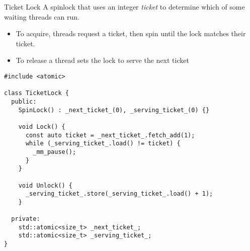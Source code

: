 \begin{definitionbox}{Ticket Lock}
	A spinlock that uses an integer \textit{ticket} to determine which of some waiting threads can run.
	\begin{itemize}
		\item To acquire, threads request a ticket, then spin until the lock matches their ticket.
		\item To release a thread sets the lock to serve the next ticket
	\end{itemize}
\end{definitionbox}

\begin{verbatim}
#include <atomic>

class TicketLock {
  public:
    SpinLock() : _next_ticket_(0), _serving_ticket_(0) {}

    void Lock() {
      const auto ticket = _next_ticket_.fetch_add(1);
      while (_serving_ticket_.load() != ticket) {
        _mm_pause();
      }
    }

    void Unlock() {
      _serving_ticket_.store(_serving_ticket_.load() + 1);
    }
  
  private:
    std::atomic<size_t> _next_ticket_;
    std::atomic<size_t> _serving_ticket_;
}
\end{verbatim}

